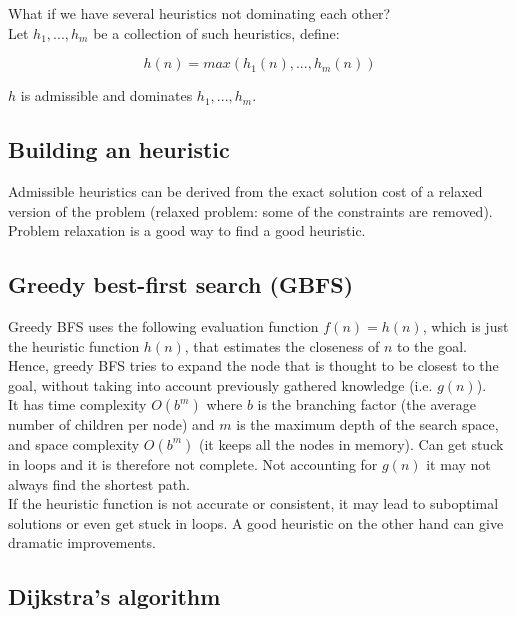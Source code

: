 \documentclass{article}
\begin{document}
What if we have several heuristics not dominating each other? \\

Let $h_1, ..., h_m$ be a collection of such heuristics, define:

\begin{equation}
    h(n) = max (h_1(n), ..., h_m(n))
\end{equation}

$h$ is admissible and dominates $h_1, ..., h_m$.

\subsection{Building an heuristic}

Admissible heuristics can be derived from the exact solution cost of a relaxed version of the problem (relaxed problem: some of the constraints are removed). Problem relaxation is a good way to find a good heuristic. \\

\newpage

\subsection{Greedy best-first search (GBFS)}

Greedy BFS uses the following evaluation function $f(n) = h(n)$, which is just the heuristic function $h(n)$, that estimates the closeness of $n$ to the goal. Hence, greedy BFS tries to expand the node that is thought to be closest to the goal, without taking into account previously gathered knowledge (i.e. $g(n)$). \\

It has time complexity $O(b^m)$ where $b$ is the branching factor (the average number of children per node) and $m$ is the maximum depth of the search space, and space complexity $O(b^m)$ (it keeps all the nodes in memory). Can get stuck in loops and it is therefore not complete. Not accounting for $g(n)$ it may not always find the shortest path. \\

If the heuristic function is not accurate or consistent, it may lead to suboptimal solutions or even get stuck in loops. A good heuristic on the other hand can give dramatic improvements. 

\newpage

\subsection{Dijkstra's algorithm}
\end{document}
